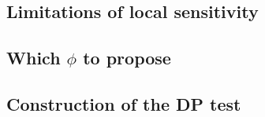 \subsection{Limitations of local sensitivity}

\label{subsections:local_sensitivity}
\subsection{Which $\phi$ to propose}

\label{subsections:which_phi}


\subsection{Construction of the DP test}

\label{subsections:test_construction}











